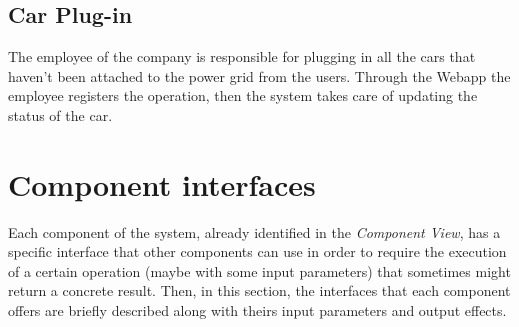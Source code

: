 \documentclass[11pt,a4paper]{report}
\begin{document}
\subsection{Car Plug-in}
The employee of the company is responsible for plugging in all the cars that haven't been attached to the power grid from the users. Through the Webapp the employee registers the operation, then the system takes care of updating the status of the car.
\section{Component interfaces}
Each component of the system, already identified in the \textit{Component View}, has a specific interface that other components can use in order to require the execution of a certain operation (maybe with some input parameters) that sometimes might return a concrete result. Then, in this section, the interfaces that each component offers are briefly described along with theirs input parameters and output effects.
\end{document}
